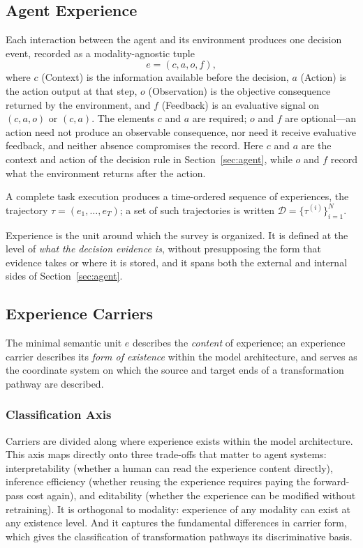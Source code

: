 \subsection{Agent Experience}
\label{sec:experience}

Each interaction between the agent and its environment produces one decision event, recorded as a modality-agnostic tuple
\[
  e = (c, a, o, f),
\]
where $c$ (Context) is the information available before the decision, $a$ (Action) is the action output at that step, $o$ (Observation) is the objective consequence returned by the environment, and $f$ (Feedback) is an evaluative signal on $(c,a,o)$ or $(c,a)$. The elements $c$ and $a$ are required; $o$ and $f$ are optional---an action need not produce an observable consequence, nor need it receive evaluative feedback, and neither absence compromises the record. Here $c$ and $a$ are the context and action of the decision rule in Section~\ref{sec:agent}, while $o$ and $f$ record what the environment returns after the action.

A complete task execution produces a time-ordered sequence of experiences, the trajectory $\tau = (e_1, \dots, e_T)$; a set of such trajectories is written $\mathcal{D} = \{\tau^{(i)}\}_{i=1}^N$.

Experience is the unit around which the survey is organized. It is defined at the level of \emph{what the decision evidence is}, without presupposing the form that evidence takes or where it is stored, and it spans both the external and internal sides of Section~\ref{sec:agent}.

\subsection{Experience Carriers}
\label{sec:carriers}

The minimal semantic unit $e$ describes the \emph{content} of experience; an experience carrier describes its \emph{form of existence} within the model architecture, and serves as the coordinate system on which the source and target ends of a transformation pathway are described.

\subsubsection{Classification Axis}

Carriers are divided along where experience exists within the model architecture. This axis maps directly onto three trade-offs that matter to agent systems: interpretability (whether a human can read the experience content directly), inference efficiency (whether reusing the experience requires paying the forward-pass cost again), and editability (whether the experience can be modified without retraining). It is orthogonal to modality: experience of any modality can exist at any existence level. And it captures the fundamental differences in carrier form, which gives the classification of transformation pathways its discriminative basis.


